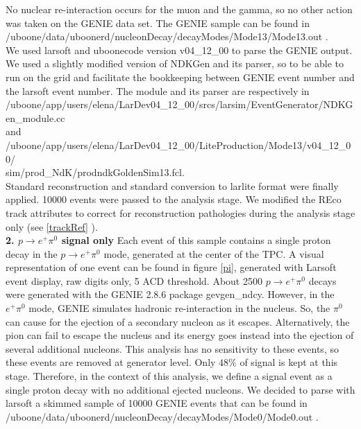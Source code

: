 \documentclass[a4paper, 10pt]{article}
\begin{document}
\noindent No nuclear re-interaction occurs for the muon and the gamma, so no other action was taken on the GENIE data set. The GENIE sample can be found in \\
/uboone/data/uboonerd/nucleonDecay/decayModes/Mode13/Mode13.out .\\
We used larsoft and uboonecode version v04\_12\_00 to parse the GENIE output.
We used a slightly modified version of NDKGen and its parser, so to be able to run on the grid and facilitate the bookkeeping between GENIE event number and the larsoft event number. The module and its parser are respectively in \\
/uboone/app/users/elena/LarDev04\_12\_00/srcs/larsim/EventGenerator/NDKGen\_module.cc \\
and  \\
/uboone/app/users/elena/LarDev04\_12\_00/LiteProduction/Mode13/v04\_12\_00/\\
sim/prod\_NdK/prodndkGoldenSim13.fcl. \\
Standard reconstruction and standard conversion to larlite format were finally applied. 10000 events were passed to the analysis stage. We modified the REco track attributes  to correct for reconstruction pathologies  during the analysis stage  only (see \ref{trackRef} ).\\

{\bf 2. $p \rightarrow e^{+} \pi^{0}$  signal only} Each event of this sample contains a single proton decay in the $p \rightarrow e^{+} \pi^{0}$ mode, generated at the center of the TPC. A visual representation of one event can be found in figure \ref{pi}, generated with Larsoft event display, raw digits only, 5 ACD threshold. 
About 2500 $p \rightarrow e^{+} \pi^{0}$ decays were generated with the GENIE 2.8.6 package gevgen\_ndcy. However, in the $e^{+} \pi^{0}$ mode, GENIE simulates hadronic re-interaction in the nucleus. So, the $\pi^{0}$ can cause for the ejection of a secondary nucleon as it escapes. Alternatively, the pion can fail to escape the nucleus and its energy goes instead into the ejection of several additional nucleons. This analysis has no sensitivity to these events, so these events are removed at generator level. Only $48\%$ of signal is kept at this stage. Therefore, in the context of this analysis, we define a signal event as a single proton decay with no additional ejected nucleons. We decided to parse with larsoft a skimmed sample of 10000 GENIE events that can be found in \\
/uboone/data/uboonerd/nucleonDecay/decayModes/Mode0/Mode0.out .
\end{document}
